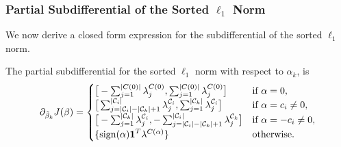 \subsubsection{Partial Subdifferential of the Sorted \(\ell_1\) Norm}

We now derive a closed form expression for the subdifferential
of the sorted \(\ell_1\) norm.
\begin{theorem}
  \label{thm:cluster-subdifferential}
  The partial subdifferential for the sorted \(\ell_1\) norm with respect
  to \(\alpha_k\), is
  \[
    \partial_{\tilde \beta_k}  J(\beta)       =
    \begin{cases}
      \big[-\sum_{j=1}^{|C(0)|}\lambda^{C(0)}_j, \sum_{j=1}^{|C(0)|}\lambda^{C(0)}_j\big]                                                                        & \text{if } \alpha = 0,           \\
      \big[\sum_{j=|\mathcal{C}_i| - |\mathcal{C}_k|+1}^{|\mathcal{C}_i|}\lambda^{\mathcal{C}_i}_j, \sum_{j=1}^{|\mathcal{C}_k|}\lambda^{\mathcal{C}_i}_j\big]   & \text{if } \alpha = c_i \neq 0,  \\
      \big[-\sum_{j=1}^{|\mathcal{C}_k|}\lambda^{\mathcal{C}_i}_j, -\sum_{j=|\mathcal{C}_i| - |\mathcal{C}_k|+1}^{|\mathcal{C}_i|}\lambda^{\mathcal{C}_k}_j\big] & \text{if } \alpha = -c_i \neq 0, \\
      \{\operatorname{sign}(\alpha)\boldsymbol{1}^T\lambda^{C(\alpha)}\}                                                                                                       & \text{otherwise.
      }
    \end{cases}
  \]
\end{theorem}
